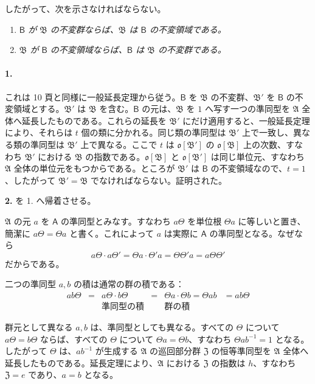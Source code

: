 したがって、次を示さなければならない。
\begin{enumerate}
\item \emph{$\mathsf B$ が $\mathfrak B$ の不変群ならば、$\mathfrak B$ は $\mathsf B$ の不変領域である。}
\item \emph{$\mathfrak B$ が $\mathsf B$ の不変領域ならば、$\mathsf B$ は $\mathfrak B$ の不変群である。}
\end{enumerate}

\paragraph{1.}
これは 10 頁と同様に一般延長定理から従う。$\mathsf B$ を $\mathfrak B$ の不変群、$\mathfrak B'$ を $\mathsf B$ の不変領域とする。$\mathfrak B'$ は $\mathfrak B$ を含む。$\mathsf B$ の元は、$\mathfrak B$ を $1$ へ写す一つの準同型を $\mathfrak A$ 全体へ延長したものである。これらの延長を $\mathfrak B'$ にだけ適用すると、一般延長定理により、それらは $t$ 個の類に分かれる。同じ類の準同型は $\mathfrak B'$ 上で一致し、異なる類の準同型は $\mathfrak B'$ 上で異なる。ここで $t$ は $\mathfrak o[\mathfrak B']$ の $\mathfrak o[\mathfrak B]$ 上の次数、すなわち $\mathfrak B'$ における $\mathfrak B$ の指数である。$\mathfrak o[\mathfrak B]$ と $\mathfrak o[\mathfrak B']$ は同じ単位元、すなわち $\mathfrak A$ 全体の単位元をもつからである。ところが $\mathfrak B'$ は $\mathsf B$ の不変領域なので、$t=1$、したがって $\mathfrak B'=\mathfrak B$ でなければならない。証明された。

\textbf{2.} を 1. へ帰着させる。

$\mathfrak A$ の元 $a$ を $\mathsf A$ の準同型とみなす。すなわち $a\Theta$ を単位根 $\Theta a$ に等しいと置き、簡潔に $a\Theta=\Theta a$ と書く。これによって $a$ は実際に $\mathsf A$ の準同型となる。なぜなら
\[
a\Theta\cdot a\Theta'=\Theta a\cdot\Theta' a=\Theta\Theta' a=a\Theta\Theta'
\]
だからである。

二つの準同型 $a,b$ の積は通常の群の積である：
\[
\begin{array}{cccccc}
ab\Theta&=&a\Theta\cdot b\Theta&=&\Theta a\cdot\Theta b=\Theta ab&=ab\Theta\\
&&\text{準同型の積}&&\text{群の積}&
\end{array}
\]

群元として異なる $a,b$ は、準同型としても異なる。すべての $\Theta$ について $a\Theta=b\Theta$ ならば、すべての $\Theta$ について $\Theta a=\Theta b$、すなわち $\Theta ab^{-1}=1$ となる。したがって $\Theta$ は、$ab^{-1}$ が生成する $\mathfrak A$ の巡回部分群 $\mathfrak Z$ の恒等準同型を $\mathfrak A$ 全体へ延長したものである。延長定理により、$\mathfrak A$ における $\mathfrak Z$ の指数は $h$、すなわち $\mathfrak Z=e$ であり、$a=b$ となる。

